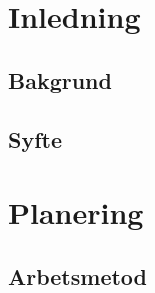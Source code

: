 %
%
%


\section{Inledning}\label{inledning}


\subsection{Bakgrund}


\subsection{Syfte}



\section{Planering}


\subsection{Arbetsmetod}

